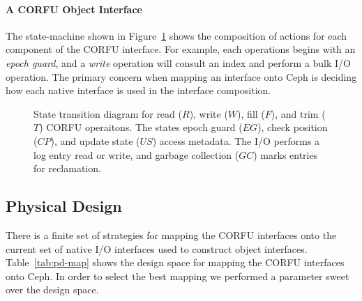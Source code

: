\documentclass[10pt,twocolumn]{article}
\begin{document}
\paragraph*{A CORFU Object Interface}
The state-machine shown in Figure~\ref{fig:corfu-sm} shows the composition of
actions for each component of the CORFU interface. For example, each
operations begins with an \emph{epoch guard}, and a \emph{write} operation
will consult an index and perform a bulk I/O operation.  The primary concern
when mapping an interface onto Ceph is deciding how each native interface is
used in the interface composition.

\begin{figure}
\centering
{}
\caption{State transition diagram for read ($R$), write ($W$), fill ($F$), and
trim ($T$) CORFU operaitons. The states epoch guard ($EG$), check position ($CP$),
and update state ($US$) access metadata. The I/O performs a log entry read or
write, and garbage collection ($GC$) marks entries for reclamation.}
\label{fig:corfu-sm}
\end{figure}

\subsection{Physical Design}

There is a finite set of strategies for mapping the CORFU interfaces onto the
current set of native I/O interfaces used to construct object interfaces.
Table~\ref{tab:pd-map} shows the design space for mapping the CORFU interfaces
onto Ceph. In order to select the best mapping we performed a parameter sweet
over the design space.
\end{document}
